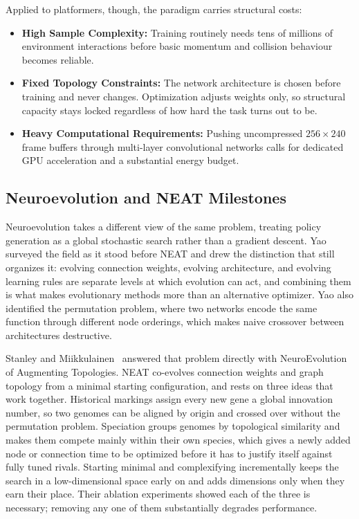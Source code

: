 \noindent
Applied to platformers, though, the paradigm carries structural costs:

\begin{itemize}
    \item \textbf{High Sample Complexity:} Training routinely needs tens of
    millions of environment interactions before basic momentum and collision
    behaviour becomes reliable.

    \item \textbf{Fixed Topology Constraints:} The network architecture is
    chosen before training and never changes. Optimization adjusts weights
    only, so structural capacity stays locked regardless of how hard the task
    turns out to be.

    \item \textbf{Heavy Computational Requirements:} Pushing uncompressed
    $256 \times 240$ frame buffers through multi-layer convolutional networks
    calls for dedicated GPU acceleration and a substantial energy budget.
\end{itemize}

\subsection{Neuroevolution and NEAT Milestones}
\label{subsec:lit-3}

Neuroevolution takes a different view of the same problem, treating policy
generation as a global stochastic search rather than a gradient descent. Yao~\cite{yao1999} surveyed the field as it stood before NEAT and drew the distinction that
still organizes it: evolving connection weights, evolving architecture, and
evolving learning rules are separate levels at which evolution can act, and
combining them is what makes evolutionary methods more than an alternative
optimizer. Yao also identified the permutation problem, where two networks
encode the same function through different node orderings, which makes naive
crossover between architectures destructive.

\noindent
Stanley and Miikkulainen~\cite{stanley2002} answered that problem directly with
NeuroEvolution of Augmenting Topologies. NEAT co-evolves connection weights and
graph topology from a minimal starting configuration, and rests on three ideas
that work together. Historical markings assign every new gene a global
innovation number, so two genomes can be aligned by origin and crossed over
without the permutation problem. Speciation groups genomes by topological
similarity and makes them compete mainly within their own species, which gives a
newly added node or connection time to be optimized before it has to justify
itself against fully tuned rivals. Starting minimal and complexifying
incrementally keeps the search in a low-dimensional space early on and adds
dimensions only when they earn their place. Their ablation experiments showed
each of the three is necessary; removing any one of them substantially degrades
performance.

